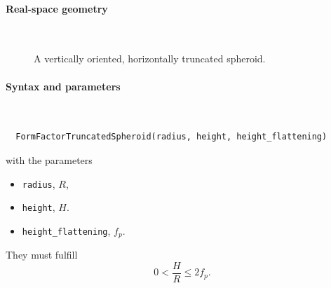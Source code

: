  \label{STruncatedSpheroid}

\paragraph{Real-space geometry}\strut\\

\begin{figure}[H]
\hfill
{}
\hfill
{}
\hfill
{}
\hfill
\caption{A vertically oriented, horizontally truncated spheroid.}
\end{figure}

\paragraph{Syntax and parameters}\strut\\[-2ex plus .2ex minus .2ex]
\begin{lstlisting}
  FormFactorTruncatedSpheroid(radius, height, height_flattening)
\end{lstlisting}
with the parameters
\begin{itemize}
\item \texttt{radius}, $R$,
\item \texttt{height}, $H$.
\item \texttt{height\_flattening}, $f_p$.
\end{itemize}
They must fulfill
\begin{displaymath}
  0< \dfrac{H}{R}\le 2f_p.
\end{displaymath}

